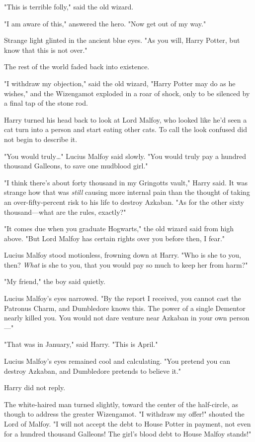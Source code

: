 "This is terrible folly," said the old wizard.

"I am aware of this," answered the hero. "Now get out of my way."

Strange light glinted in the ancient blue eyes. "As you will, Harry Potter, but 
know that this is not over."

The rest of the world faded back into existence.

"I withdraw my objection," said the old wizard, "Harry Potter may do as he 
wishes," and the Wizengamot exploded in a roar of shock, only to be silenced by 
a final tap of the stone rod.

Harry turned his head back to look at Lord Malfoy, who looked like he'd seen a 
cat turn into a person and start eating other cats. To call the look confused 
did not begin to describe it.

"You would truly{\ldots}" Lucius Malfoy said slowly. "You would truly pay a 
hundred thousand Galleons, to save one mudblood girl."

"I think there's about forty thousand in my Gringotts vault," Harry said. It 
was strange how that was \emph{still} causing more internal pain than the 
thought of taking an over-fifty-percent risk to his life to destroy Azkaban. 
"As for the other sixty thousand---what are the rules, exactly?"

"It comes due when you graduate Hogwarts," the old wizard said from high above. 
"But Lord Malfoy has certain rights over you before then, I fear."

Lucius Malfoy stood motionless, frowning down at Harry. "Who is she to you, 
then? \emph{What} is she to you, that you would pay so much to keep her from 
harm?"

"My friend," the boy said quietly.

Lucius Malfoy's eyes narrowed. "By the report I received, you cannot cast the 
Patronus Charm, and Dumbledore knows this. The power of a single Dementor 
nearly killed you. You would not dare venture near Azkaban in your own 
person---"

"That was in January," said Harry. "This is April."

Lucius Malfoy's eyes remained cool and calculating. "You pretend you can 
destroy Azkaban, and Dumbledore pretends to believe it."

Harry did not reply.

The white-haired man turned slightly, toward the center of the half-circle, as 
though to address the greater Wizengamot. "I withdraw my offer!" shouted the 
Lord of Malfoy. "I will not accept the debt to House Potter in payment, not 
even for a hundred thousand Galleons! The girl's blood debt to House Malfoy 
stands!"

